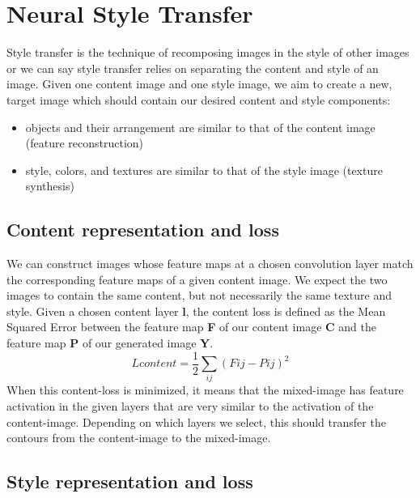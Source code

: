 \chapter{Neural Style Transfer}
\begin{styletransfer}
    Style transfer is the technique of recomposing images in the style of other images or we can say style transfer relies on separating the content and style of an image. Given one content image and one style image, we aim to create a new, target image which should contain our desired content and style components:
        \begin{itemize}
            \item objects and their arrangement are similar to that of the content image (feature reconstruction) 
            \item style, colors, and textures are similar to that of the style image (texture synthesis)
        \end{itemize}
     
\section{Content representation and loss}
    We can construct images whose feature maps at a chosen convolution layer match the corresponding feature maps of a given content image. We expect the two images to contain the same content, but not necessarily the same texture and style. Given a chosen content layer \textbf{l}, the content loss is defined as the Mean Squared Error between the feature map \textbf{F} of our content image \textbf{C} and the feature map \textbf{P} of our generated image \textbf{Y}.
    \[Lcontent = \frac{1}{2}\sum_{i j}^{ } \left ( Fij - Pij \right )^{2}\]
    When this content-loss is minimized, it means that the mixed-image has feature activation in the given layers that are very similar to the activation of the content-image. Depending on which layers we select, this should transfer the contours from the content-image to the mixed-image.

\section{Style representation and loss}


\end{styletransfer}

